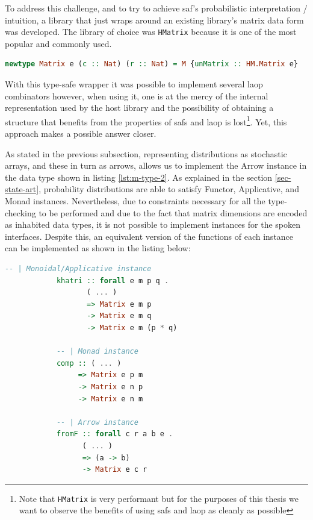 \documentclass[
  oneside,
  11pt, a4paper,
  footinclude=true,
  headinclude=true,
  cleardoublepage=empty
]{scrbook}
\theoremstyle{definition}
\theoremstyle{definition}
\begin{document}
	    To address this challenge, and to try to achieve \gls{saf}'s probabilistic interpretation / intuition, a library that just wraps around an existing library's matrix data form was developed. The library of choice was \texttt{HMatrix} \citep{hmatrix} because it is one of the most popular and commonly used.
	    
        \begin{lstlisting}[language=Haskell, label={lst:m-type-2}, caption={Type-safe wrapper around HMatrix},captionpos=b]
        newtype Matrix e (c :: Nat) (r :: Nat) = M {unMatrix :: HM.Matrix e}
        \end{lstlisting}{}
        
        With this type-safe wrapper it was possible to implement several \gls{laop} combinators however, when using it, one is at the mercy of the internal representation used by the host library and the possibility of obtaining a structure that benefits from the properties of \glspl{saf} and \gls{laop} is lost\footnote{Note that \texttt{HMatrix} is very performant but for the purposes of this thesis we want to observe the benefits of using \glspl{saf} and \gls{laop} as cleanly as possible}. Yet, this approach makes a possible answer closer. 
        
        As stated in the previous subsection, representing distributions as stochastic arrays, and these in turn as arrows, allows us to implement the Arrow instance in the data type shown in listing \ref{lst:m-type-2}. As explained in the section \ref{sec-state-art}, probability distributions are able to satisfy Functor, Applicative, and Monad instances. Nevertheless, due to constraints necessary for all the type-checking to be performed and due to the fact that matrix dimensions are encoded as inhabited data types, it is not possible to implement instances for the spoken interfaces. Despite this, an equivalent version of the functions of each instance can be implemented as shown in the listing below:
        
        \begin{lstlisting}[language=Haskell, caption={Interface equivalent function implementations},captionpos=b]
            -- | Monoidal/Applicative instance
            khatri :: forall e m p q .
                   ( ... )
                   => Matrix e m p 
                   -> Matrix e m q
                   -> Matrix e m (p * q)

            -- | Monad instance
            comp :: ( ... )
                 => Matrix e p m
                 -> Matrix e n p 
                 -> Matrix e n m

            -- | Arrow instance
            fromF :: forall c r a b e . 
                  ( ... ) 
                  => (a -> b) 
                  -> Matrix e c r
        \end{lstlisting}{}
        
\end{document}
